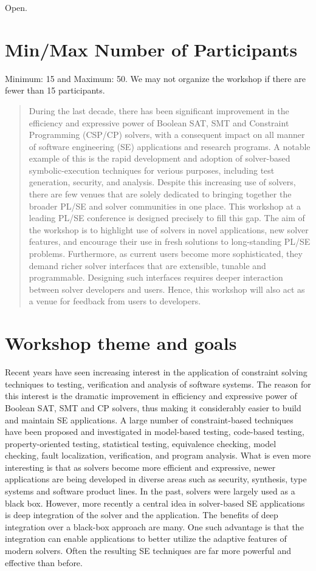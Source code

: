 \documentclass{sig-alternate}
\begin{document}
Open.

\section{Min/Max Number of Participants}

Minimum: 15 and Maximum: 50. We may not organize the workshop if
there are fewer than 15 participants.

\begin{abstract}
During the last decade, there has been significant improvement in the
efficiency and expressive power of Boolean SAT, SMT and Constraint Programming
(CSP/CP) solvers, with a consequent impact on all manner of software
engineering (SE) applications and research programs. A notable example of this
is the rapid development and adoption of solver-based symbolic-execution
techniques for verious purposes, including test generation, security, and
analysis. Despite this increasing use of solvers, there are few venues that are
solely dedicated to bringing together the broader PL/SE and solver communities
in one place. This workshop at a leading PL/SE conference is designed precisely
to fill this gap. The aim of the workshop is to highlight use of solvers in
novel applications, new solver features, and encourage their use in fresh
solutions to long-standing PL/SE problems. Furthermore, as current users become
more sophisticated, they demand richer solver interfaces that are extensible,
tunable and programmable. Designing such interfaces requires deeper interaction 
between solver developers and users. Hence, this workshop will also act as a
venue for feedback from users to developers.

\end{abstract}

\section{Workshop theme and goals}
Recent years have seen increasing interest in the
application of constraint solving techniques to testing, verification
and analysis of software systems. The reason for this interest is the
dramatic improvement in efficiency and expressive power of Boolean
SAT, SMT and CP solvers, thus making it considerably easier to build
and maintain SE applications. A large
number of constraint-based techniques have been proposed and
investigated in model-based testing, code-based testing,
property-oriented testing, statistical testing, equivalence checking,
model checking, fault localization, verification, and program
analysis.  What is even more interesting is that as solvers become
more efficient and expressive, newer applications are being developed
in diverse areas such as security, synthesis, type systems and
software product lines. In the past, solvers were largely used as
a black box. However, more recently a central idea in solver-based SE
applications is deep integration of the solver and the application. The
benefits of deep integration over a black-box approach are many. One such advantage is that the integration can enable
applications to better utilize the adaptive features of modern
solvers. Often the resulting SE techniques are far more powerful and
effective than before.
\end{document}
